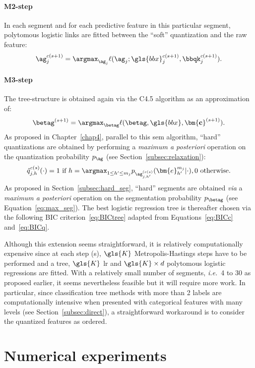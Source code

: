 \paragraph{M2-step} In each segment and for each predictive feature in this particular segment, polytomous logistic links are fitted between the ``soft'' quantization and the raw feature:
\[ \ag_j^{c(s+1)} = \argmax_{\ag_j} \ell(\ag_j;\gls{bbx}_j^{c(s+1)},\bbqk_j^{c(s+1)}). \]
\paragraph{M3-step} The tree-structure is obtained again via the C4.5 algorithm as an approximation of:
\[ \betag^{(s+1)} = \argmax_{\betag} \ell(\betag, \gls{bbx}, \mathbf{\bm{c}}^{(s+1)}). \]
As proposed in Chapter~\ref{chap4}, parallel to this \gls{sem} algorithm, ``hard'' quantizations are obtained by performing a \textit{maximum a posteriori} operation on the quantization probability $p_{\ag}$ (see Section~\ref{subsec:relaxation}):
\[ \hat{q}_{j,h}^{c(s)}(\cdot) = 1 \text{ if } h = \argmax_{1 \leq h' \leq m_j} p_{{\ag}_{j,h'}^{(c(s)}}(\bm{e}_{h'}^{m_j} | \cdot), 0 \text{ otherwise.} \]
As proposed in Section~\ref{subsec:hard_seg}, ``hard'' segments are obtained \textit{via} a \textit{maximum a posteriori} operation on the segmentation probability $p_{\betag}$ (see Equation~\eqref{eq:max_seg}). The best logistic regression tree is thereafter chosen via the following BIC criterion~\eqref{eq:BICtree} adapted from Equations~\eqref{eq:BICc} and~\eqref{eq:BICq}.

Although this extension seems straightforward, it is relatively computationally expensive since at each step (s), $\gls{K}$ Metropolis-Hastings steps have to be performed and a tree, $\gls{K}$ \gls{lr} and $\gls{K} \times d$ polytomous logistic regressions are fitted. With a relatively small number of segments, \textit{i.e.}\ 4 to 30 as proposed earlier, it seems nevertheless feasible but it will require more work. In particular, since classification tree methods with more than 2 labels are computationally intensive when presented with categorical features with many levels (see Section~\ref{subsec:direct}), a straightforward workaround is to consider the quantized features as ordered.

\section{Numerical experiments} \label{sec:num_exp}

